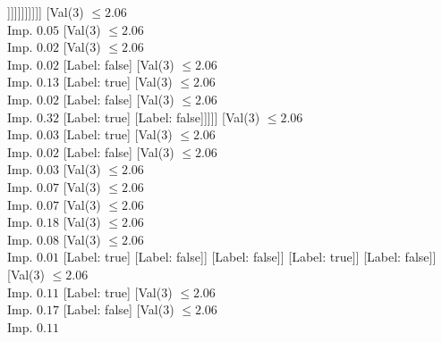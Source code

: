 \documentclass[margin=10pt]{standalone}
\begin{document}
\begin{forest}
																[Label: false]
																[Val($3$) $ \leq 2.05$ \\ Imp. $0.04$
																	[Label: true]
																	[Val($3$) $ \leq 2.05$ \\ Imp. $0.18$
																		[Label: false]
																		[Val($3$) $ \leq 2.05$ \\ Imp. $0.12$
																			[Label: true]
																			[Val($3$) $ \leq 2.05$ \\ Imp. $0.50$
																				[Label: false]
																				[Label: true]]]]]]]]]]]
										[Val($3$) $ \leq 2.06$ \\ Imp. $0.05$
											[Val($3$) $ \leq 2.06$ \\ Imp. $0.02$
												[Val($3$) $ \leq 2.06$ \\ Imp. $0.02$
													[Label: false]
													[Val($3$) $ \leq 2.06$ \\ Imp. $0.13$
														[Label: true]
														[Val($3$) $ \leq 2.06$ \\ Imp. $0.02$
															[Label: false]
															[Val($3$) $ \leq 2.06$ \\ Imp. $0.32$
																[Label: true]
																[Label: false]]]]]
												[Val($3$) $ \leq 2.06$ \\ Imp. $0.03$
													[Label: true]
													[Val($3$) $ \leq 2.06$ \\ Imp. $0.02$
														[Label: false]
														[Val($3$) $ \leq 2.06$ \\ Imp. $0.03$
															[Val($3$) $ \leq 2.06$ \\ Imp. $0.07$
																[Val($3$) $ \leq 2.06$ \\ Imp. $0.07$
																	[Val($3$) $ \leq 2.06$ \\ Imp. $0.18$
																		[Val($3$) $ \leq 2.06$ \\ Imp. $0.08$
																			[Val($3$) $ \leq 2.06$ \\ Imp. $0.01$
																				[Label: true]
																				[Label: false]]
																			[Label: false]]
																		[Label: true]]
																	[Label: false]]
																[Val($3$) $ \leq 2.06$ \\ Imp. $0.11$
																	[Label: true]
																	[Val($3$) $ \leq 2.06$ \\ Imp. $0.17$
																		[Label: false]
																		[Val($3$) $ \leq 2.06$ \\ Imp. $0.11$

\end{forest}
\end{document}
